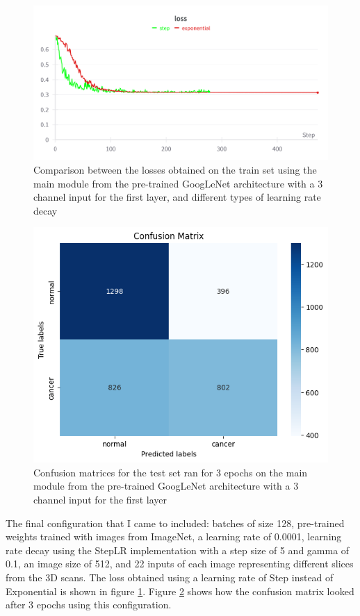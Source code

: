 \begin{figure}[!ht]
    \centering
    \includegraphics[width=1\linewidth]{figures/Figure24.png}
    \caption{Comparison between the losses obtained on the train set using the main module from the pre-trained GoogLeNet architecture with a 3 channel input for the first layer, and different types of learning rate decay}
    \label{fig:fig22}
\end{figure}

\begin{figure}[H]
    \centering
    \includegraphics[width=0.5\linewidth]{figures/Figure37.png}
    \caption{Confusion matrices for the test set ran for 3 epochs on the main module from the pre-trained GoogLeNet architecture with a 3 channel input for the first layer}
    \label{fig:fig31}
\end{figure}

The final configuration that I came to included: batches of size 128, pre-trained weights trained with images from ImageNet, a learning rate of 0.0001, learning rate decay using the StepLR implementation with a step size of 5 and gamma of 0.1, an image size of 512, and 22 inputs of each image representing different slices from the 3D scans. The loss obtained using a learning rate of Step instead of Exponential is shown in figure \ref{fig:fig22}. Figure \ref{fig:fig31} shows how the confusion matrix looked after 3 epochs using this configuration.

